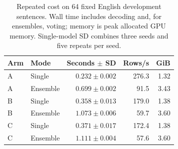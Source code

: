 \begin{table}[t]
\centering\small\setlength{\tabcolsep}{3pt}
\caption{Repeated cost on 64 fixed English development sentences. Wall time includes decoding and, for ensembles, voting; memory is peak allocated GPU memory. Single-model SD combines three seeds and five repeats per seed.}\label{tab:cost}
\begin{tabular}{llrrr}
\toprule
Arm & Mode & Seconds $\pm$ SD & Rows/s & GiB \\
\midrule
A & Single & $0.232\pm0.002$ & 276.3 & 1.32 \\
A & Ensemble & $0.699\pm0.002$ & 91.5 & 3.43 \\
B & Single & $0.358\pm0.013$ & 179.0 & 1.38 \\
B & Ensemble & $1.073\pm0.006$ & 59.7 & 3.60 \\
C & Single & $0.371\pm0.017$ & 172.4 & 1.38 \\
C & Ensemble & $1.111\pm0.004$ & 57.6 & 3.60 \\
\bottomrule
\end{tabular}
\end{table}
